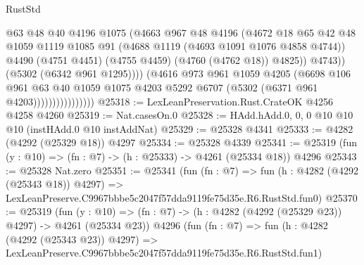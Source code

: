 \begin{lexlean}{RustStd}
\begin{coremodule}
                                    @63
                                    @48
                                    @40
                                    @4196
                                    @1075
                                    (@4663
                                      @967
                                      @48
                                      @4196
                                      (@4672
                                        @18
                                        @65
                                        @42
                                        @48
                                        @1059
                                        @1119
                                        @1085
                                        @91
                                        (@4688 @1119 (@4693 @1091 @1076 @4858 @4744))
                                        @4490
                                        (@4751 @4451)
                                        (@4755 @4459)
                                        (@4760 (@4762 @18))
                                        @4825))
                                    @4743))
                                (@5302 (@6342 @961 @1295))))
                            (@4616
                              @973
                              @961
                              @1059
                              @4205
                              (@6698
                                @106
                                @961
                                @63
                                @40
                                @1059
                                @1075
                                @4203
                                @5292
                                @6707
                                (@5302 (@6371 @961 @4203))))))))))))))))
@25318 := LexLeanPreservation.Rust.CrateOK @4256 @4258 @4260
@25319 := Nat.casesOn.{0}
@25328 := HAdd.hAdd.{0, 0, 0} @10 @10 @10 (instHAdd.{0} @10 instAddNat)
@25329 := @25328 @4341
@25333 := @4282 (@4292 (@25329 @18)) @4297
@25334 := @25328 @4339
@25341 := @25319 (fun (y : @10) => (fn : @7) -> (h : @25333) -> @4261 (@25334 @18)) @4296
@25343 := @25328 Nat.zero
@25351 := @25341
    (fun (fn : @7) =>
    fun (h : @4282 (@4292 (@25343 @18)) @4297) =>
    LexLeanPreserve.C9967bbbe5c2047f57dda9119fe75d35e.R6.RustStd.fun0)
@25370 := @25319
    (fun (y : @10) => (fn : @7) -> (h : @4282 (@4292 (@25329 @23)) @4297) -> @4261 (@25334 @23))
    @4296
    (fun (fn : @7) =>
    fun (h : @4282 (@4292 (@25343 @23)) @4297) =>
    LexLeanPreserve.C9967bbbe5c2047f57dda9119fe75d35e.R6.RustStd.fun1)

\end{coremodule}
\end{lexlean}
